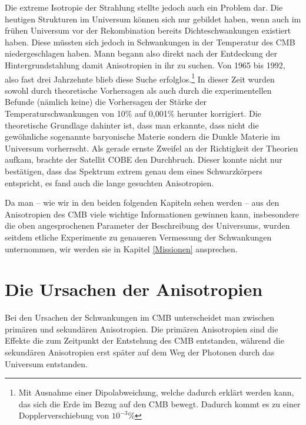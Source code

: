 \documentclass[10pt,a4paper]{article}
\begin{document}
Die extreme Isotropie der Strahlung stellte jedoch auch ein Problem dar. Die heutigen Strukturen im Universum können sich nur gebildet haben, wenn auch im frühen Universum vor der Rekombination bereits Dichteschwankungen existiert haben. Diese müssten sich jedoch in Schwankungen in der Temperatur des CMB niedergeschlagen haben. Mann begann also direkt nach der Entdeckung der Hintergrundstahlung damit Anisotropien in ihr zu suchen. Von 1965 bis 1992, also fast drei Jahrzehnte blieb diese Suche erfolglos.\footnote{Mit Ausnahme einer Dipolabweichung, welche dadurch erklärt werden kann, das sich die Erde im Bezug auf den CMB bewegt. Dadurch kommt es zu einer Dopplerverschiebung von $10^{-3}$\%} %
In dieser Zeit wurden sowohl durch theoretische Vorhersagen als auch durch die experimentellen Befunde (nämlich keine) die Vorhersagen der Stärke der Temperaturschwankungen von 10\% auf 0,001\%  herunter korrigiert.
Die theoretische Grundlage dahinter ist, dass man erkannte, dass nicht die gewöhnliche sogenannte baryonische Materie sondern die Dunkle Materie im Universum vorherrscht.
Als gerade ernste Zweifel an der Richtigkeit der Theorien aufkam, brachte der Satellit COBE den Durchbruch. Dieser konnte nicht nur bestätigen, dass das Spektrum extrem genau dem eines Schwarzkörpers entspricht, %
es fand auch die lange gesuchten Anisotropien.

Da man -- wie wir in den beiden folgenden Kapiteln sehen werden -- aus den Anisotropien des CMB viele wichtige Informationen gewinnen kann, insbesondere die oben angesprochenen Parameter der Beschreibung des Universums, wurden seitdem etliche Experimente zu genaueren Vermessung der Schwankungen unternommen, wir werden sie in Kapitel \ref{Missionen} ansprechen.

\section{Die Ursachen der Anisotropien}
Bei den Ursachen der Schwankungen im CMB unterscheidet man zwischen primären und sekundären Anisotropien. Die primären Anisotropien sind die Effekte die zum Zeitpunkt der Entstehung des CMB entstanden, während die sekundären Anisotropien erst später auf dem Weg der Photonen durch das Universum entstanden.
\end{document}
